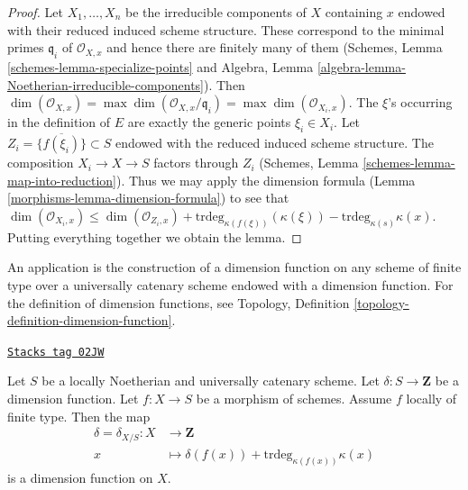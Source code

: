 \begin{proof}

Let $X_1, \ldots, X_n$ be the irreducible components of $X$ containing $x$
endowed with their reduced induced scheme structure.
These correspond to the minimal primes $\mathfrak q_i$ of
$\mathcal{O}_{X, x}$ and hence there are finitely many of them
(Schemes, Lemma \ref{schemes-lemma-specialize-points} and
Algebra, Lemma \ref{algebra-lemma-Noetherian-irreducible-components}).
Then
$\dim(\mathcal{O}_{X, x}) = \max \dim(\mathcal{O}_{X, x}/\mathfrak q_i)
= \max \dim(\mathcal{O}_{X_i, x})$.
The $\xi$'s occurring in the definition of $E$ are exactly the
generic points $\xi_i \in X_i$. Let $Z_i = \overline{\{f(\xi_i)\}} \subset S$
endowed with the reduced induced scheme structure.
The composition $X_i \to X \to S$ factors through $Z_i$
(Schemes, Lemma \ref{schemes-lemma-map-into-reduction}). Thus we may apply
the dimension formula (Lemma \ref{morphisms-lemma-dimension-formula})
to see that
$\dim(\mathcal{O}_{X_i, x}) \leq \dim(\mathcal{O}_{Z_i, x}) +
\text{trdeg}_{\kappa(f(\xi))}(\kappa(\xi)) -
\text{trdeg}_{\kappa(s)} \kappa(x)$. Putting everything together
we obtain the lemma.
\end{proof}

An application is the construction of a dimension function
on any scheme of finite type over a universally catenary
scheme endowed with a dimension function. For the definition
of dimension functions, see
Topology, Definition \ref{topology-definition-dimension-function}.

\begin{lemma}
\label{morphisms-lemma-dimension-function-propagates}
\href{https://stacks.math.columbia.edu/tag/02JW}{\texttt{Stacks tag 02JW}}

Let $S$ be a locally Noetherian and universally catenary scheme.
Let $\delta : S \to \mathbf{Z}$ be a dimension function.
Let $f : X \to S$ be a morphism of schemes.
Assume $f$ locally of finite type.
Then the map
\begin{align*}
\delta = \delta_{X/S} : X & \longrightarrow \mathbf{Z} \\
x & \longmapsto \delta(f(x)) + \text{trdeg}_{\kappa(f(x))} \kappa(x)
\end{align*}
is a dimension function on $X$.
\end{lemma}

